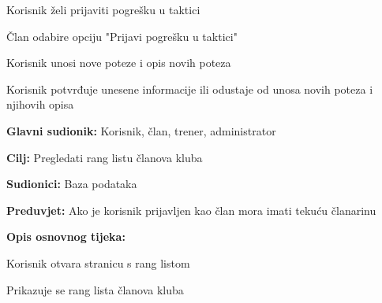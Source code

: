 \begin{packed_item}
\begin{packed_item}
\begin{packed_enum}
						\end{packed_enum}
					
						\item[3.b] Korisnik želi prijaviti pogrešku u taktici
					\item[] \begin{packed_enum}
						
						\item Član odabire opciju "Prijavi pogrešku u taktici"
						\item Korisnik unosi nove poteze i opis novih poteza
						\item Korisnik potvrđuje unesene informacije ili odustaje od unosa novih poteza i njihovih opisa
							\end{packed_enum}
						\end{packed_item}
					\end{packed_item}


					\noindent {}
					\begin{packed_item}
	
						\item \textbf{Glavni sudionik: }Korisnik, član, trener, administrator
						\item  \textbf{Cilj: }Pregledati rang listu članova kluba
						\item  \textbf{Sudionici: }Baza podataka
						\item  \textbf{Preduvjet: }Ako je korisnik prijavljen kao član mora imati tekuću članarinu
						\item  \textbf{Opis osnovnog tijeka:}
						
						\item[] \begin{packed_enum}
	
							\item Korisnik otvara stranicu s rang listom
							\item Prikazuje se rang lista članova kluba
							
						\end{packed_enum}
					\end{packed_item}
					

